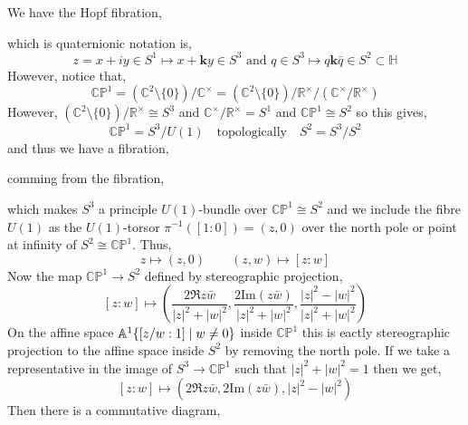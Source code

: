 \documentclass[12pt]{extarticle}
\newcommand{\R}{\mathbb{R}}
\renewcommand{\Im}[1]{\mathrm{Im}(#1)}
\theoremstyle{definition}
\renewcommand{\bf}[1]{\mathbf{#1}}
\newcommand{\C}{\mathbb{C}}
\renewcommand{\H}{\mathbb{H}}
\newcommand{\CP}{\mathbb{CP}}
\begin{document}
We have the Hopf fibration,
\begin{center}
\end{center}
which is quaternionic notation is,
\[ z =  x + i y \in S^1 \mapsto x + \bf{k} y \in S^3 \text{ and } q \in S^3 \mapsto q \bf{k} \bar{q} \in S^2 \subset \H \]
However, notice that,
\[ \CP^1 = (\C^2 \setminus \{ 0 \}) / \C^\times = (\C^2 \setminus \{ 0 \})/\R^\times /(\C^\times / \R^\times) \]
However, $(\C^2 \setminus \{ 0 \})/\R^\times \cong S^3$ and $\C^\times / \R^\times = S^1$ and $\CP^1 \cong S^2$ so this gives,
\[ \CP^1 = S^3 / U(1) \quad \text{topologically} \quad S^2 = S^3 / S^2 \]
and thus we have a fibration,
\begin{center}
\end{center}
comming from the fibration,
\begin{center}
\end{center}
which makes $S^3$ a principle $U(1)$-bundle over $\CP^1 \cong S^2$ and we include the fibre $U(1)$ as the $U(1)$-torsor $\pi^{-1}([1 : 0]) = (z, 0)$ over the north pole or point at infinity of $S^2 \cong \CP^1$. Thus,
\[ z \mapsto (z, 0) \quad \quad (z, w) \mapsto [z : w] \]
Now the map $\CP^1 \to S^2$ defined by stereographic projection,
\[ [z : w] \mapsto \left( \frac{2 \Re{z \bar{w}}}{|z|^2 + |w|^2}, \frac{2 \Im{z \bar{w}}}{|z|^2 + |w|^2}, \frac{|z|^2 - |w|^2}{|z|^2 + |w|^2} \right) \]
On the affine space $\mathbb{A}^1 \{ [ z / w : 1 ] \mid w \neq 0 \}$ inside $\CP^1$ this is eactly stereographic projection to the affine space inside $S^2$ by removing the north pole. 
If we take a representative in the image of $S^3 \to \CP^1$ such that $|z|^2 + |w|^2 = 1$ then we get,
\[ [z : w] \mapsto \left( 2 \Re{z \bar{w}}, 2 \Im{z \bar{w}},  |z|^2 - |w|^2 \right) \]
Then there is a commutative diagram,
\begin{center}
\end{center}
\end{document}
